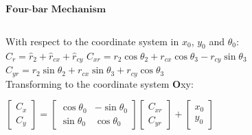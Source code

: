 \documentclass[]{beamer}
\begin{document}
{{\begin{columns}[T]
\begin{column}{.5\textwidth}
    \end{column}
  \end{columns}
 }
 {
 $\textbf{Four-bar Mechanism}$\\
\vspace{0.5cm}

\begin{columns}[T]
    \begin{column}{.5\textwidth}
    With respect to the coordinate system in $x_0$, $y_0$ and $\theta_0$:\\
    \vspace{0.5cm}
    $\widehat{C}_r=\widehat{r}_2+\widehat{r}_{cx}+\widehat{r}_{cy}$
    $C_{xr}=r_2 \cos \theta_2 + r_{cx} \cos \theta_3 - r_{cy} \sin \theta_3$
    $C_{yr}=r_2 \sin \theta_2 + r_{cx} \sin \theta_3 + r_{cy} \cos \theta_3$\\
    \vspace{0.5cm}
    Transforming to the coordinate system \textbf{O}xy:\\
	\vspace{0.5cm}
	
	\begin{small}
 	$\begin{bmatrix}
 	C_x \\
 	C_y 
 	\end{bmatrix}=
 	\begin{bmatrix}
 	\cos \theta_0 & - \sin \theta_0 \\
 	\sin \theta_0 & \cos \theta_0
 	\end{bmatrix}
 	\begin{bmatrix}
 	C_{xr} \\
 	C_{yr} 
 	\end{bmatrix}+
 	\begin{bmatrix}
 	x_0 \\
 	y_0 
 	\end{bmatrix}$   
    \end{small}
    
    \end{column}
    
    \begin{column}{.5\textwidth}
    

\end{column}
\end{columns}}}
\end{document}
